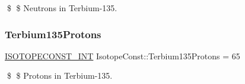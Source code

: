 \$ \$ Neutrons in Terbium-\/135. \mbox{\label{group___isotope_const-_terbium-_tb135_gaa678ee698fb3edd16117e607cb305361}} 
\subsubsection{\texorpdfstring{Terbium135\+Protons}{Terbium135Protons}}
{\footnotesize\ttfamily \mbox{\hyperlink{group___isotope_const-_macros_ga5f18360b3e99483a35c32d789e62621c}{I\+S\+O\+T\+O\+P\+E\+C\+O\+N\+S\+T\+\_\+\+I\+NT}} Isotope\+Const\+::\+Terbium135\+Protons = 65}

\$ \$ Protons in Terbium-\/135. 